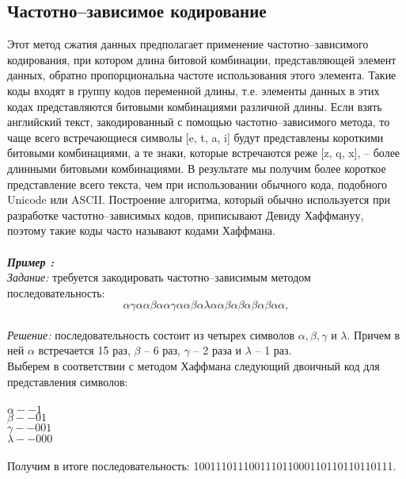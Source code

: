 \subsection{Частотно--зависимое кодирование}
Этот метод сжатия данных предполагает применение частотно--зависимого кодирования, при котором длина битовой комбинации, представляющей элемент данных, обратно пропорциональна частоте использования этого элемента. Такие коды входят в группу кодов переменной длины, т.е. элементы данных в этих кодах представляются битовыми комбинациями различной длины. Если взять английский текст, закодированный с помощью частотно--зависимого метода, то чаще всего встречающиеся символы [e, t, a, i] будут представлены короткими битовыми комбинациями, а те знаки, которые встречаются реже [z, q, x], -- более длинными битовыми комбинациями. В результате мы получим более короткое представление всего текста, чем при использовании обычного кода, подобного Unicode или ASCII. Построение алгоритма, который обычно используется при разработке частотно--зависимых кодов, приписывают Девиду Хаффмануу, поэтому такие коды часто называют кодами Хаффмана.\\
\\\emph{\textbf{Пример :}}
\\\emph{Задание:} требуется закодировать частотно--зависимым методом последовательность:\\ $$\alpha\gamma\alpha\alpha\beta\alpha\alpha\gamma\alpha\alpha\beta\alpha\lambda\alpha\alpha\beta\alpha\beta\alpha\beta\alpha\beta\alpha\alpha,$$
\\\emph{Решение:} последовательность состоит из четырех символов $\alpha, \beta, \gamma$ и $\lambda$. Причем в ней $\alpha$ встречается 15 раз, $\beta$ -- 6 раз, $\gamma$ -- 2 раза и $\lambda$ -- 1 раз.\\
Выберем в соответствии с методом Хаффмана следующий двоичный код для представления символов:\\
\\$\alpha -- 1$
\\$\beta -- 01$
\\$\gamma -- 001$
\\$\lambda -- 000$\\
\\Получим в итоге последовательность: 100111011100111011000110110110110111.
